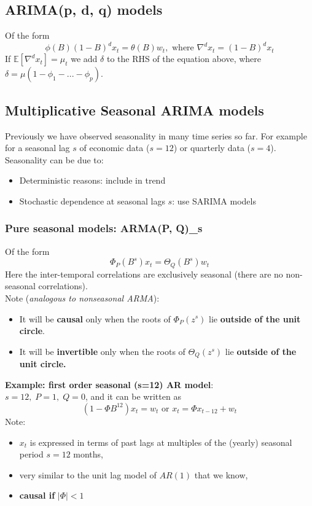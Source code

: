 \documentclass[11pt]{article}
\newcommand{\noi}{\noindent}
\begin{document}
\subsection{ARIMA(p, d, q) models}
\noi Of the form
$$\phi(B)(1-B)^dx_t = \theta(B)w_t, \text{ where } \nabla^dx_t = (1-B)^d x_t$$
\noi If $\mathbb{E}[\nabla^d x_t] = \mu_t$ we add $\delta$ to the RHS of the equation above, where $\delta = \mu(1 - \phi_1 - ... - \phi_p)$.

\subsection{Multiplicative Seasonal ARIMA models}
\noi Previously we have observed seasonality in many time series so far. For example for a seasonal lag $s$ of economic data ($s=12$) or quarterly data ($s=4$). \\

\noi Seasonality can be due to:
\begin{itemize}
    \item Deterministic reasons: include in trend
    \item Stochastic dependence at seasonal lags $s$: use SARIMA models
\end{itemize}

\subsubsection{Pure seasonal models: ARMA(P, Q)_s}
\noi Of the form
$$\Phi_P(B^s)x_t = \Theta_Q(B^s)w_t$$
\noi Here the inter-temporal correlations are exclusively seasonal (there are no non-seasonal correlations). \\

\noi Note (\textit{analogous to nonseasonal ARMA}):
\begin{itemize}
    \item It will be \textbf{causal} only when the roots of $\Phi_P(z^s)$ lie \textbf{outside of the unit circle}.
    \item It will be \textbf{invertible} only when the roots of $\Theta_Q(z^s)$ lie \textbf{outside of the unit circle.}
\end{itemize} \phantom{i}

\noi \textbf{Example: first order seasonal (s=12) AR model}: \\
\noi $s=12, \; P=1, \; Q=0$, and it can be written as
$$(1-\Phi B^{12})x_t = w_t \text{ or } x_t = \Phi x_{t-12} + w_t$$
\noi Note:
\begin{itemize}
    \item $x_t$ is expressed in terms of past lags at multiples of the (yearly) seasonal period $s=12$ months,
    \item very similar to the unit lag model of $AR(1)$ that we know,
    \item \textbf{causal if} $|\Phi| < 1$
\end{itemize} \phantom{i}
\end{document}
